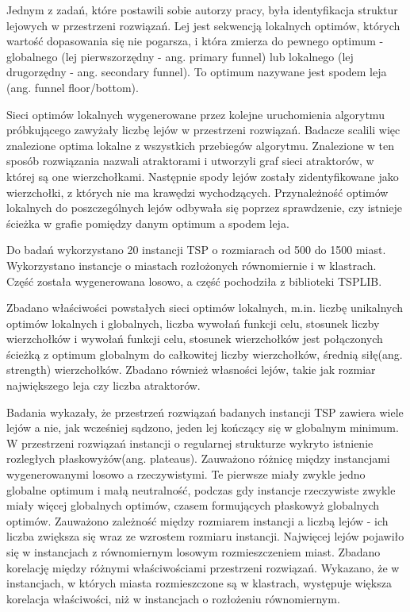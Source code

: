 Jednym z zadań, które postawili sobie autorzy pracy, była identyfikacja struktur lejowych w przestrzeni rozwiązań.
Lej jest sekwencją lokalnych optimów, których wartość dopasowania się nie pogarsza,
i która zmierza do pewnego optimum - globalnego (lej pierwszorzędny - ang. primary funnel) lub lokalnego (lej drugorzędny - ang. secondary funnel).
To optimum nazywane jest spodem leja (ang. funnel floor/bottom).

Sieci optimów lokalnych wygenerowane przez kolejne uruchomienia algorytmu próbkującego zawyżały liczbę lejów w przestrzeni rozwiązań.
Badacze scalili więc znalezione optima lokalne z wszystkich przebiegów algorytmu.
Znalezione w ten sposób rozwiązania nazwali atraktorami i utworzyli graf sieci atraktorów, w której są one wierzchołkami.
Następnie spody lejów zostały zidentyfikowane jako wierzchołki, z których nie ma krawędzi wychodzących.
Przynależność optimów lokalnych do poszczególnych lejów odbywała się poprzez sprawdzenie,
czy istnieje ścieżka w grafie pomiędzy danym optimum a spodem leja.

Do badań wykorzystano 20 instancji TSP o rozmiarach od 500 do 1500 miast.
Wykorzystano instancje o miastach rozłożonych równomiernie i w klastrach.
Część została wygenerowana losowo, a część pochodziła z biblioteki TSPLIB.

Zbadano właściwości powstałych sieci optimów lokalnych, m.in. liczbę unikalnych optimów lokalnych i globalnych, liczba wywołań funkcji celu,
stosunek liczby wierzchołków i wywołań funkcji celu, stosunek wierzchołków jest połączonych ścieżką
z optimum globalnym do całkowitej liczby wierzchołków, średnią siłę(ang. strength) wierzchołków.
Zbadano również własności lejów, takie jak rozmiar największego leja czy liczba atraktorów.

Badania wykazały, że przestrzeń rozwiązań badanych instancji TSP zawiera wiele lejów a nie, jak wcześniej sądzono,
jeden lej kończący się w globalnym minimum. W przestrzeni rozwiązań instancji o regularnej strukturze
wykryto istnienie rozległych płaskowyżów(ang. plateaus). Zauważono różnicę między instancjami wygenerowanymi losowo a rzeczywistymi.
Te pierwsze miały zwykle jedno globalne optimum i małą neutralność, podczas gdy instancje rzeczywiste
zwykle miały więcej globalnych optimów, czasem formujących płaskowyż globalnych optimów.
Zauważono zależność między rozmiarem instancji a liczbą lejów - ich liczba zwiększa się wraz ze wzrostem
rozmiaru instancji. Najwięcej lejów pojawiło się w instancjach z równomiernym losowym rozmieszczeniem miast.
Zbadano korelację między różnymi właściwościami przestrzeni rozwiązań.
Wykazano, że w instancjach, w których miasta rozmieszczone są w klastrach, występuje większa korelacja
właściwości, niż w instancjach o rozłożeniu równomiernym.

